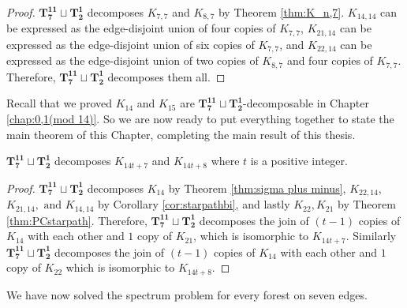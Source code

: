 \begin{proof}
    $\mathbf{T_{7}^{11}}\sqcup\mathbf{T_{2}^{1}}$ decomposes $K_{7,7}$ and $K_{8,7}$ by Theorem \ref{thm:K_n,7}. $K_{14,14}$ can be expressed as the edge-disjoint union of four copies of $K_{7,7}$, $K_{21,14}$ can be expressed as the edge-disjoint union of six copies of $K_{7,7}$, and $K_{22,14}$ can be expressed as the edge-disjoint union of two copies of $K_{8,7}$ and four copies of $K_{7,7}$. Therefore, $\mathbf{T_{7}^{11}}\sqcup\mathbf{T_{2}^{1}}$ decomposes them all.

\end{proof}
Recall that we proved $K_{14}$ and $K_{15}$ are $\mathbf{T_{7}^{11}}\sqcup\mathbf{T_{2}^{1}}$-decomposable in Chapter \ref{chap:0,1(mod 14)}. So we are now ready to put everything together to state the main theorem of this Chapter, completing the main result of this thesis.
\begin{thm}
$\mathbf{T_{7}^{11}}\sqcup\mathbf{T_{2}^{1}}$ decomposes $K_{14t+7}$ and $K_{14t+8}$ where $t$ is a positive integer. 
\end{thm}
\begin{proof}
$\mathbf{T_{7}^{11}}\sqcup\mathbf{T_{2}^{1}}$ decomposes $K_{14}$ by Theorem \ref{thm:sigma plus minus}, $K_{22,14}$, $K_{21,14},\text{ and }K_{14,14}$ by Corollary \ref{cor:starpathbi}, and lastly $K_{22},K_{21}$ by Theorem \ref{thm:PCstarpath}.
\newline\newline
Therefore, $\mathbf{T_{7}^{11}}\sqcup\mathbf{T_{2}^{1}}$ decomposes the join of $(t-1)$ copies of $K_{14}$ with each other and $1$ copy of $K_{21}$, which is isomorphic to $K_{14t+7}$. Similarly $\mathbf{T_{7}^{11}}\sqcup\mathbf{T_{2}^{1}}$ decomposes the join of $(t-1)$ copies of $K_{14}$ with each other and $1$ copy of $K_{22}$ which is isomorphic to $K_{14t+8}$.

\end{proof}

We have now solved the spectrum problem for every forest on seven edges. 